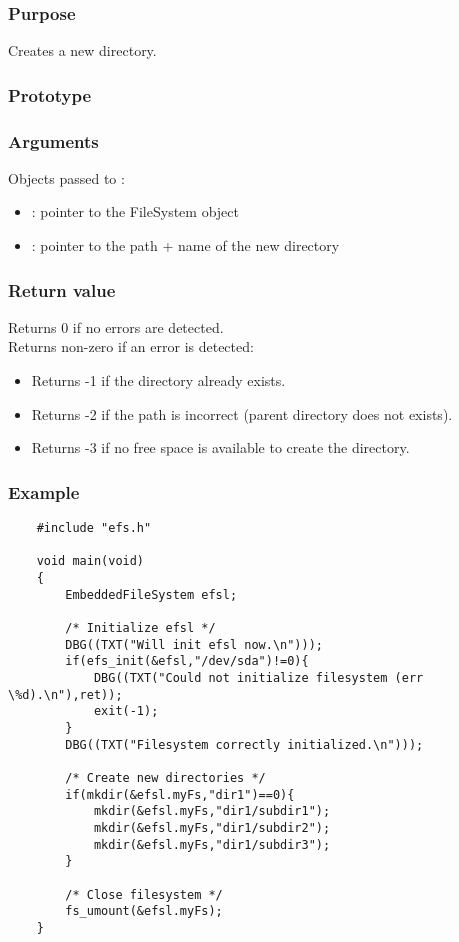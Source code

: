 \subsubsection*{Purpose}
Creates a new directory.
\subsubsection*{Prototype}
\subsubsection*{Arguments}
Objects passed to :
\begin{itemize}
	\item{: pointer to the FileSystem object}
	\item{: pointer to the path + name of the new directory}
\end{itemize}
\subsubsection*{Return value}
Returns 0 if no errors are detected.\\
\newline
Returns non-zero if an error is detected:
\begin{itemize}
	\item{Returns -1 if the directory already exists.}
	\item{Returns -2 if the path is incorrect (parent directory does not exists).}
	\item{Returns -3 if no free space is available to create the directory.}
\end{itemize}
\subsubsection*{Example}
\lstset{numbers=left, stepnumber=1, numberstyle=\small, numbersep=5pt, tabsize=4}
\begin{lstlisting}
	#include "efs.h"

	void main(void)
	{
		EmbeddedFileSystem efsl;

		/* Initialize efsl */
		DBG((TXT("Will init efsl now.\n")));
		if(efs_init(&efsl,"/dev/sda")!=0){
			DBG((TXT("Could not initialize filesystem (err \%d).\n"),ret));
			exit(-1);
		}
		DBG((TXT("Filesystem correctly initialized.\n")));

		/* Create new directories */
		if(mkdir(&efsl.myFs,"dir1")==0){
			mkdir(&efsl.myFs,"dir1/subdir1");
			mkdir(&efsl.myFs,"dir1/subdir2");
			mkdir(&efsl.myFs,"dir1/subdir3");
		}
		
		/* Close filesystem */
		fs_umount(&efsl.myFs);
	}
\end{lstlisting}
